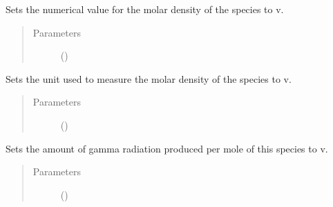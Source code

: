 \documentclass[letterpaper,10pt,openany,oneside,english]{sphinxmanual}
\begin{document}
\begin{fulllineitems}
\begin{fulllineitems}
\begin{quote}
\begin{description}
\end{description}\end{quote}

\end{fulllineitems}


\begin{fulllineitems}
\label{\detokenize{support_rst/specie:specie.Specie.SetMolarCC}}
Sets the numerical value for the molar density of the species to v.
\begin{quote}\begin{description}
\item[{Parameters}] \leavevmode
{} () \textendash{} 

\end{description}\end{quote}

\end{fulllineitems}


\begin{fulllineitems}
\label{\detokenize{support_rst/specie:specie.Specie.SetMolarCCUnit}}
Sets the unit used to measure the molar density of the species to v.
\begin{quote}\begin{description}
\item[{Parameters}] \leavevmode
{} () \textendash{} 

\end{description}\end{quote}

\end{fulllineitems}


\begin{fulllineitems}
\label{\detokenize{support_rst/specie:specie.Specie.SetMolarGammaPwr}}
Sets the amount of gamma radiation produced per mole of this species to
v.
\begin{quote}\begin{description}
\item[{Parameters}] \leavevmode
{} () \textendash{} 


\end{description}
\end{quote}
\end{fulllineitems}
\end{fulllineitems}
\end{document}
